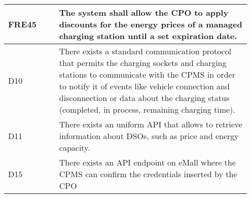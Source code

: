 {\begin{longtable}{|p{0.20\linewidth}p{0.75\linewidth} |}
    \hline
    \rowcolor{bluepoli!15} FRE45 &  The system shall allow the CPO to apply discounts for the energy prices of a managed charging station until a set expiration date.\\
    \hline
    \rowcolor{bluepoli!5} D10 & There exists a standard communication protocol that permits the charging sockets and charging stations to communicate with the CPMS in order to notify it of events like vehicle connection and disconnection or data about the charging status (completed, in process, remaining charging time).\\
    \hline    
    \rowcolor{bluepoli!5} D11 & There exists an uniform API that allows to retrieve information about DSOs, such as price and energy capacity. \\
    \hline
    \rowcolor{bluepoli!5} D15& There exists an API endpoint on eMall where the CPMS can confirm the credentials inserted by the CPO\\
    \hline
\end{longtable}}

